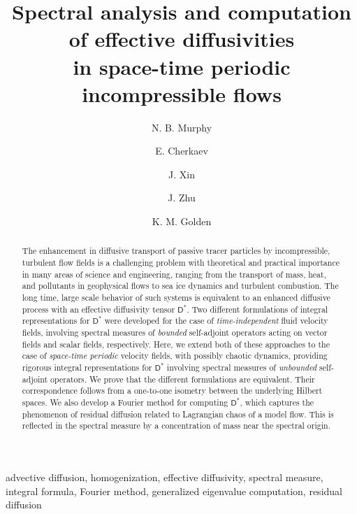 \documentclass[leqno,onefignum,onetabnum]{siamltex1213}
\title{Spectral analysis and computation 
  of effective diffusivities \\in 
  space-time periodic incompressible flows  
      }
\author{
N. B. Murphy\footnotemark[1]
\and E. Cherkaev\footnotemark[2]
\and J. Xin\footnotemark[1]
\and J. Zhu\footnotemark[2]
\and K. M. Golden\footnotemark[2]%
}
\newcommand{\Dm}{\mathsf{D}}
\begin{document}
\maketitle
{}%

\renewcommand{\thefootnote}{\fnsymbol{footnote}}


\renewcommand{\thefootnote}{\arabic{footnote}}

 
\begin{abstract}
 The enhancement in diffusive transport of passive tracer particles by
incompressible, turbulent flow fields is a challenging problem with
theoretical and practical importance in many areas of science and
engineering, ranging from the transport of mass, heat, and pollutants
in geophysical flows to sea ice dynamics and turbulent combustion. The
long time, large scale behavior of such systems is equivalent to an
enhanced diffusive process with an effective diffusivity tensor
$\Dm^*$. Two different formulations of integral representations for
$\Dm^*$ were developed for the case of \emph{time-independent} fluid
velocity fields, involving spectral measures of \emph{bounded}
self-adjoint operators acting on vector fields and scalar fields,
respectively. Here, we extend both of these approaches to the case of
\emph{space-time periodic} velocity fields, with possibly chaotic
dynamics, providing rigorous integral representations for $\Dm^*$
involving spectral measures of \emph{unbounded} self-adjoint
operators. We prove that the different formulations are
equivalent. Their correspondence follows from a one-to-one isometry
between the underlying Hilbert spaces. We also develop a Fourier
method for computing $\Dm^*$, which captures the phenomenon of
residual diffusion related to Lagrangian chaos of a model flow. This
is reflected in the spectral measure by a concentration of mass near
the spectral origin.    
\end{abstract}

\begin{keywords}
advective diffusion, homogenization, effective diffusivity, spectral
measure, integral formula, Fourier method, generalized eigenvalue computation, residual diffusion
\end{keywords}
\end{document}
